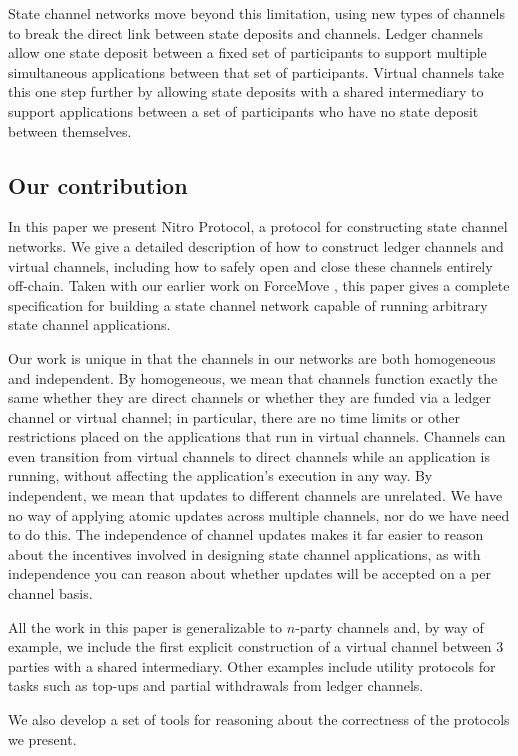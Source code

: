State channel networks move beyond this limitation, using new types of channels to break the direct link between state deposits and channels.
Ledger channels allow one state deposit between a fixed set of participants to support multiple simultaneous applications between that set of participants.
Virtual channels take this one step further by allowing state deposits with a shared intermediary to support applications between a set of participants who have no state deposit between themselves.

\subsection{Our contribution}

In this paper we present Nitro Protocol, a protocol for constructing state channel networks.
We give a detailed description of how to construct ledger channels and virtual channels, including how to safely open and close these channels entirely off-chain.
Taken with our earlier work on ForceMove \cite{force-move}, this paper gives a complete specification for building a state channel network capable of running arbitrary state channel applications.

Our work is unique in that the channels in our networks are both homogeneous and independent.
By homogeneous, we mean that channels function exactly the same whether they are direct channels or whether they are funded via a ledger channel or virtual channel;
in particular, there are no time limits or other restrictions placed on the applications that run in virtual channels.
Channels can even transition from virtual channels to direct channels while an application is running, without affecting the application's execution in any way.
By independent, we mean that updates to different channels are unrelated.
We have no way of applying atomic updates across multiple channels, nor do we have need to do this.
The independence of channel updates makes it far easier to reason about the incentives involved in designing state channel applications, as with independence you can reason about whether updates will be accepted on a per channel basis.

All the work in this paper is generalizable to $n$-party channels and, by way of example, we include the first explicit construction of a virtual channel between 3 parties with a shared intermediary.
Other examples include utility protocols for tasks such as top-ups and partial withdrawals from ledger channels.

We also develop a set of tools for reasoning about the correctness of the protocols we present.
















